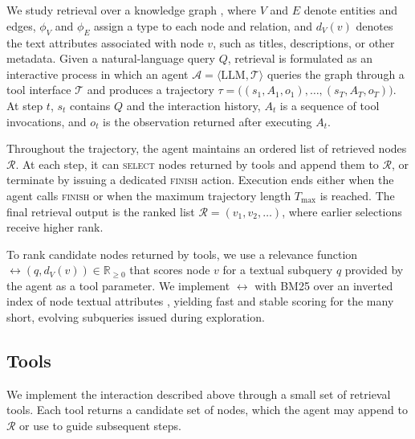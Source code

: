 \section{\retrieverNoSc}
\label{method}

We study retrieval over a knowledge graph , where $V$ and $E$ denote entities and edges, $\phi_V$ and $\phi_E$ assign a type to each node and relation, and $d_V(v)$ denotes the text attributes associated with node $v$, such as titles, descriptions, or other metadata. Given a natural-language query $Q$, retrieval is formulated as an interactive process in which an agent $\mathcal{A}=\langle \mathrm{LLM},\mathcal{T}\rangle$ queries the graph through a tool interface $\mathcal{T}$ \cite{yao_react_2023,schick_toolformer_2023} and produces a trajectory $\tau = \bigl((s_1,A_1,o_1),\dots,(s_T,A_T,o_T)\bigr)$. At step $t$, $s_t$ contains $Q$ and the interaction history, $A_t$ is a sequence of tool invocations, and $o_t$ is the observation returned after executing $A_t$.

Throughout the trajectory, the agent maintains an ordered list of retrieved nodes $\mathcal{R}$. At each step, it can \textsc{select} nodes returned by tools and append them to $\mathcal{R}$, or terminate by issuing a dedicated \textsc{finish} action. Execution ends either when the agent calls \textsc{finish} or when the maximum trajectory length $T_{\max}$ is reached. The final retrieval output is the ranked list $\mathcal{R}=(v_1,v_2,\dots)$, where earlier selections receive higher rank.

To rank candidate nodes returned by tools, we use a relevance function $\rel(q,d_V(v))\in\mathbb{R}_{\ge 0}$ that scores node $v$ for a textual subquery $q$ provided by the agent as a tool parameter. We implement $\rel$ with BM25 \cite{robertson_probabilistic_2009} over an inverted index of node textual attributes \cite{manning_introduction_2008}, yielding fast and stable scoring for the many short, evolving subqueries issued during exploration.

\subsection{Tools}
We implement the interaction described above through a small set of retrieval tools. Each tool returns a candidate set of nodes, which the agent may append to $\mathcal{R}$ or use to guide subsequent steps. \\


